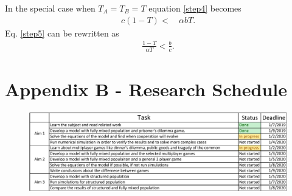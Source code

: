 \documentclass{article}
\begin{document}
In the special case when $T_A = T_B = T$ equation \eqref{step4} becomes
\begin{equation} 
\begin{split}\label{step5}
c(1-T) < & \, \alpha bT.
\end{split}
\end{equation}
Eq. \eqref{step5} can be rewritten as
\begin{equation} 
\begin{split}
 \frac{1-T}{\alpha T} < \frac{b}{c}.
\end{split}
\end{equation}

\newpage
\section*{Appendix B - Research Schedule}
\begin{figure}[h!]
  \centering
  \includegraphics[scale=1]{schdule2.pdf}
\end{figure}
\end{document}
